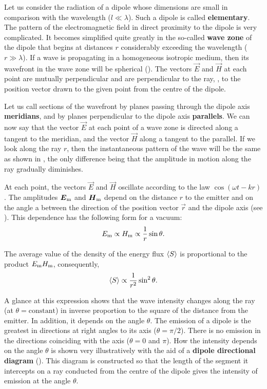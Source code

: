 Let us consider the radiation of a dipole whose dimensions are small in comparison with the wavelength ($l\ll\lambda$).
Such a dipole is called \textbf{elementary}.
The pattern of the electromagnetic field in direct proximity to the dipole is very complicated.
It becomes simplified quite greatly in the so-called \textbf{wave zone} of the dipole that begins at distances $r$ considerably exceeding the wavelength ($r\gg\lambda$).
If a wave is propagating in a homogeneous isotropic medium, then its wavefront in the wave zone will be spherical ().
The vectors $\vec{E}$ and $\vec{H}$ at each point are mutually perpendicular and are perpendicular to the ray, \ie, to the position vector drawn to the given point from the centre of the dipole.

Let us call sections of the wavefront by planes passing through the dipole axis \textbf{meridians}, and by planes perpendicular to the dipole axis \textbf{parallels}.
We can now say that the vector $\vec{E}$ at each point of a wave zone is directed along a tangent to the meridian, and the vector $\vec{H}$ along a tangent to the parallel.
If we look along the ray $r$, then the instantaneous pattern of the wave will be the same as shown in , the only difference being that the amplitude in motion along the ray gradually diminishes.

At each point, the vectors $\vec{E}$ and $\vec{H}$ oscillate according to the law $\cos(\omega t - kr)$.
The amplitudes $\boldsymbol{E}_{\text{m}}$ and $\boldsymbol{H}_{\text{m}}$ depend on the distance $r$ to the emitter and on the angle a between the direction of the position vector $\vec{r}$ and the dipole axis (see ).
This dependence has the following form for a vacuum:
\begin{equation*}
    E_{\text{m}} \propto H_{\text{m}} \propto \frac{1}{r} \sin\theta.
\end{equation*}

\noindent
The average value of the density of the energy flux $\left\langle S \right\rangle$ is proportional to the product $E_{\text{m}}H_{\text{m}}$, consequently,
\begin{equation}\label{eq:15_43}
    \left\langle S \right\rangle \propto \frac{1}{r^2} \sin^2\theta.
\end{equation}

\noindent
A glance at this expression shows that the wave intensity changes along the ray (at $\theta = \text{constant}$) in inverse proportion to the square of the distance from the emitter.
In addition, it depends on the angle $\theta$.
The emission of a dipole is the greatest in directions at right angles to its axis ($\theta = \pi/2$).
There is no emission in the directions coinciding with the axis ($\theta = 0$ and $\pi$).
How the intensity depends on the angle $\theta$ is shown very illustratively with the aid of a \textbf{dipole directional diagram} ().
This diagram is constructed so that the length of the segment it intercepts on a ray conducted from the
centre of the dipole gives the intensity of emission at the angle $\theta$.

